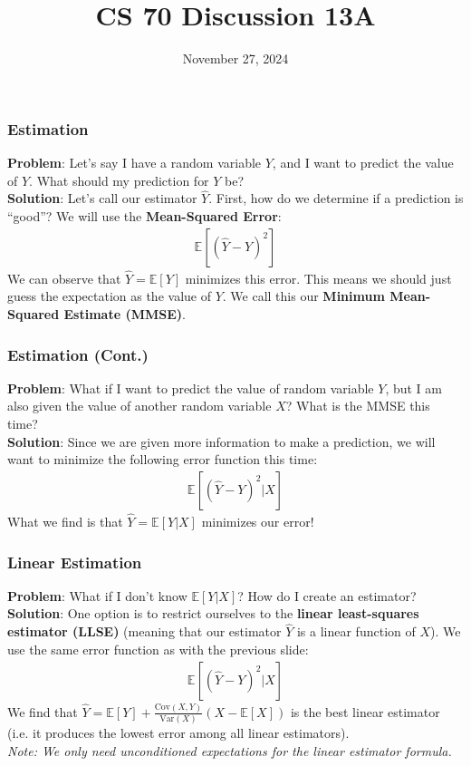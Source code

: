 \documentclass{beamer}
\title{CS 70 Discussion 13A}
\date{November 27, 2024}
\begin{document}
\frame{\titlepage}

\begin{frame}
    \frametitle{Estimation}
    {\bf Problem}: Let's say I have a random variable $Y$, and I want to predict the value of $Y$. What should my prediction for $Y$ be?\\
    {\bf Solution}: Let's call our estimator $\hat{Y}$. First, how do we determine if a prediction is ``good''? We will use the {\bf Mean-Squared Error}:
    \begin{align*}
        \mathbb{E}\left[\left(\hat{Y}-Y\right)^2\right]
    \end{align*}
    We can observe that $\hat{Y}=\mathbb{E}[Y]$ minimizes this error. This means we should just guess the expectation as the value of $Y$. We call this our {\bf Minimum Mean-Squared Estimate (MMSE)}.
\end{frame}

\begin{frame}
    \frametitle{Estimation (Cont.)}
    {\bf Problem}: What if I want to predict the value of random variable $Y$, but I am also given the value of another random variable $X$? What is the MMSE this time?\\
    {\bf Solution}: Since we are given more information to make a prediction, we will want to minimize the following error function this time:
    \begin{align*}
        \mathbb{E}\left[\left(\hat{Y}-Y\right)^2|X\right]
    \end{align*}
    What we find is that $\hat{Y}=\mathbb{E}[Y|X]$ minimizes our error!
\end{frame}

\begin{frame}
    \frametitle{Linear Estimation}
    {\bf Problem}: What if I don't know $\mathbb{E}[Y|X]$? How do I create an estimator?\\
    {\bf Solution}: One option is to restrict ourselves to the {\bf linear least-squares estimator (LLSE)} (meaning that our estimator $\hat{Y}$ is a linear function of $X$). We use the same error function as with the previous slide:
    \begin{align*}
        \mathbb{E}\left[\left(\hat{Y}-Y\right)^2|X\right]
    \end{align*}
    We find that $\hat{Y}=\mathbb{E}[Y]+\frac{\text{Cov}(X,Y)}{\text{Var}(X)}(X-\mathbb{E}[X])$ is the best linear estimator (i.e. it produces the lowest error among all linear estimators).\\
    {\it Note: We only need unconditioned expectations for the linear estimator formula.}
\end{frame}
\end{document}
